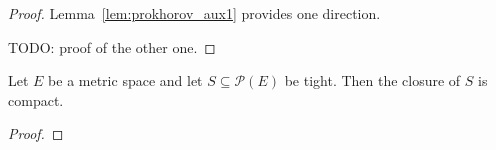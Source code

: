 \begin{proof}
Lemma~\ref{lem:prokhorov_aux1} provides one direction.

TODO: proof of the other one.
\end{proof}

\begin{lemma}\label{lem:relatively_compact_of_tight}
Let $E$ be a metric space and let $S \subseteq \mathcal P(E)$ be tight. Then the closure of $S$ is compact.
\end{lemma}

\begin{proof}
\end{proof}
